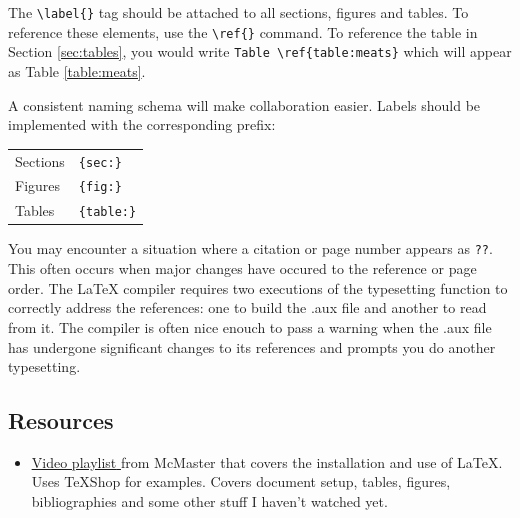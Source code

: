 \documentclass[12pt]{article}
\begin{document}
The \verb|\label{}| tag should be attached to all sections, figures and tables. To reference these elements, use the \verb|\ref{}| command. To reference the table in Section \ref{sec:tables}, you would write \verb|Table \ref{table:meats}| which will appear as Table \ref{table:meats}.


A consistent naming schema will make collaboration easier. Labels should be implemented with the corresponding prefix:
\begin{table}[h]
	\centering
	\begin{tabular}{ l l }
	Sections		& \verb|{sec:}|		\\
	Figures		& \verb|{fig:}|		\\
	Tables		& \verb|{table:}|		\\
	\end{tabular}
\end{table}

You may encounter a situation where a citation or page number appears as \verb|??|. This often occurs when major changes have occured to the reference or page order. The LaTeX compiler requires two executions of the typesetting function to correctly address the references: one to build the .aux file and another to read from it. The compiler is often nice enouch to pass a warning when the .aux file has undergone significant changes to its references and prompts you do another typesetting.

\subsection{Resources}\label{sec:resources}
\begin{itemize}
	\item \underline{\href{https://www.youtube.com/user/14mech14/videos}{Video playlist} } from McMaster that covers the installation and use of LaTeX. Uses TeXShop for examples. Covers document setup, tables, figures, bibliographies and some other stuff I haven't watched yet.
\end{itemize}

\end{document}

